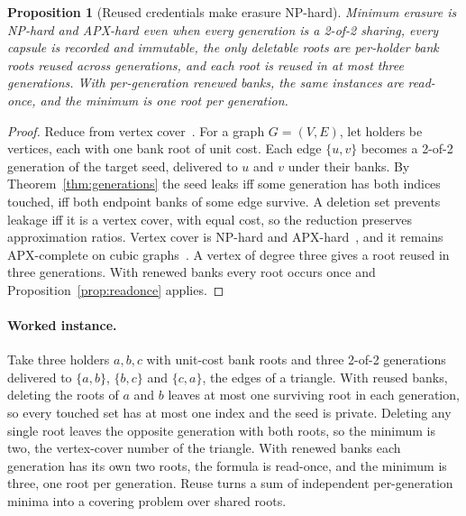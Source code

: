 \documentclass[pdflatex,sn-mathphys-num,twocolumn]{sn-jnl}
\theoremstyle{plain}
\newtheorem{proposition}[theorem]{Proposition}
\theoremstyle{definition}
\begin{document}
\begin{proposition}[Reused credentials make erasure NP-hard]\label{prop:hard}
Minimum erasure is NP-hard and APX-hard even when every generation is a 2-of-2 sharing, every capsule is recorded and immutable, the only deletable roots are per-holder bank roots reused across generations, and each root is reused in at most three generations. With per-generation renewed banks, the same instances are read-once, and the minimum is one root per generation.
\end{proposition}
\begin{proof}
Reduce from vertex cover~\cite{karp1972}. For a graph $G=(V,E)$, let holders be vertices, each with one bank root of unit cost. Each edge $\{u,v\}$ becomes a 2-of-2 generation of the target seed, delivered to $u$ and $v$ under their banks. By Theorem~\ref{thm:generations} the seed leaks iff some generation has both indices touched, iff both endpoint banks of some edge survive. A deletion set prevents leakage iff it is a vertex cover, with equal cost, so the reduction preserves approximation ratios. Vertex cover is NP-hard and APX-hard~\cite{karp1972,dinur2005}, and it remains APX-complete on cubic graphs~\cite{alimonti2000}. A vertex of degree three gives a root reused in three generations. With renewed banks every root occurs once and Proposition~\ref{prop:readonce} applies.
\end{proof}

\paragraph{Worked instance.}
Take three holders $a,b,c$ with unit-cost bank roots and three 2-of-2 generations delivered to $\{a,b\}$, $\{b,c\}$ and $\{c,a\}$, the edges of a triangle. With reused banks, deleting the roots of $a$ and $b$ leaves at most one surviving root in each generation, so every touched set has at most one index and the seed is private. Deleting any single root leaves the opposite generation with both roots, so the minimum is two, the vertex-cover number of the triangle. With renewed banks each generation has its own two roots, the formula is read-once, and the minimum is three, one root per generation. Reuse turns a sum of independent per-generation minima into a covering problem over shared roots.
\end{document}
